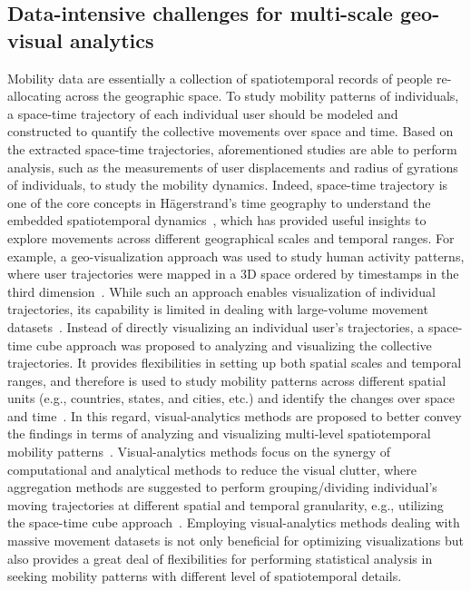 \documentclass[ijgi,article,accept,moreauthors,pdftex,10pt,a4paper]{mdpi}
\theoremstyle{mdpi}
\newcounter{ex}
\newcounter{re}
\theoremstyle{mdpidefinition}
\begin{document}
\subsection{Data-intensive challenges for multi-scale geo-visual analytics}
Mobility data are essentially a collection of spatiotemporal records of people re-allocating across the geographic space.
To study mobility patterns of individuals, a space-time trajectory of each individual user should be modeled and constructed to quantify the collective movements over space and time.
Based on the extracted space-time trajectories, aforementioned studies are able to perform analysis, such as the measurements of user displacements and radius of gyrations of individuals, to study the mobility dynamics.
Indeed, space-time trajectory is one of the core concepts in H{\"a}gerstrand's time geography to understand the embedded spatiotemporal dynamics~\cite{hagerstrand1985time}, which has provided useful insights to explore movements across different geographical scales and temporal ranges.
For example, a geo-visualization approach was used to study human activity patterns, where user trajectories were mapped in a 3D space ordered by timestamps in the third dimension~\cite{kwan2004geovisualization}.
While such an approach enables visualization of individual trajectories, its capability is limited in dealing with large-volume movement datasets~\cite{andrienko2007designing}.
Instead of directly visualizing an individual user's trajectories, a space-time cube approach was proposed to analyzing and visualizing the collective trajectories.
It provides flexibilities in setting up both spatial scales and temporal ranges, and therefore is used to study mobility patterns across different spatial units (e.g., countries, states, and cities, etc.) and identify the changes over space and time~\cite{maceachren2001research, maceachren2004maps}.
In this regard, visual-analytics methods are proposed to better convey the findings in terms of analyzing and visualizing multi-level spatiotemporal mobility patterns~\cite{andrienko2007designing,andrienko2007visual}.
Visual-analytics methods focus on the synergy of computational and analytical methods to reduce the visual clutter, where aggregation methods are suggested to perform grouping/dividing individual's moving trajectories at different spatial and temporal granularity, e.g., utilizing the space-time cube approach~\cite{andrienko2007designing}.
Employing visual-analytics methods dealing with massive movement datasets is not only beneficial for optimizing visualizations but also provides a great deal of flexibilities for performing statistical analysis in seeking mobility patterns with different level of spatiotemporal details. 
\end{document}
